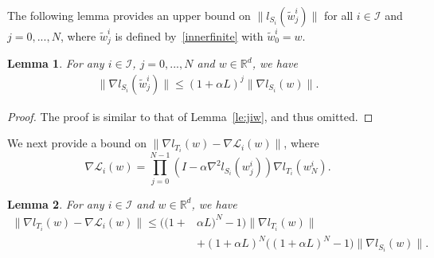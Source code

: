 \documentclass{osudissert96}
\newtheorem{lemma}{Lemma}
\begin{document}
The following lemma provides an upper bound on $\|l_{S_i}(\widetilde w^i_j)\|$  for all $i\in\mathcal{I}$ and $j=0,..., N$, where $\widetilde w_j^i$ is defined by~\cref{innerfinite} with $\widetilde w_0^i=w$. 
\begin{lemma}\label{finite:gbd}
	For any $i\in\mathcal{I}$,  $j=0,...,N$ and $w \in \mathbb{R}^d$, we have 
	\begin{align*}
	\|\nabla l_{S_i}(\widetilde w_j^i)\| \leq (1+\alpha L)^j \|\nabla l_{S_i}(w)\|.
	\end{align*}
\end{lemma}
\begin{proof}
	The proof is similar to that of Lemma~\ref{le:jiw}, and thus omitted.  
\end{proof}
We next provide a bound on  $\|\nabla l_{T_i}(w) - \nabla \mathcal{L}_i(w) \|$, where $$\nabla \mathcal{L}_i(w) = \prod_{j=0}^{N-1}(I - \alpha \nabla^2 l_{S_i}(w_{j}^i))\nabla l_{T_i}(w_{N}^i).$$
\begin{lemma}\label{tiis}
	For any $i \in\mathcal{I}$ and $w \in \mathbb{R}^d$, we have 
	\begin{align*}
	\|\nabla l_{T_i}(w) - \nabla \mathcal{L}_i(w)\| \leq \big( (1+&\alpha L)^N -1  \big)\|\nabla l_{T_i}(w)\| 
	\\&+ (1+\alpha L)^N  \big( (1+\alpha L)^N -1  \big) \|\nabla l_{S_i}(w)\|.
	\end{align*}
\end{lemma}
\end{document}
